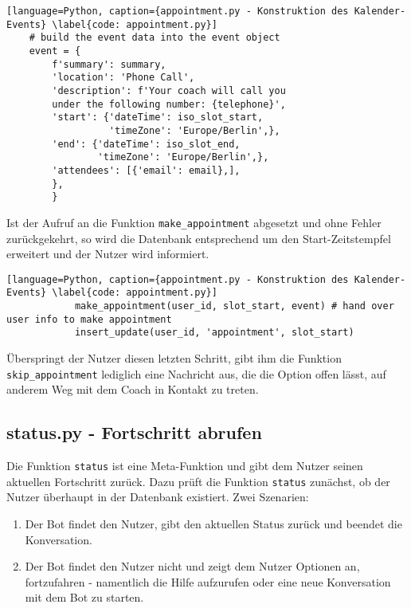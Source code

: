             \begin{lstlisting}[language=Python, caption={appointment.py - Konstruktion des Kalender-Events} \label{code: appointment.py}]
    # build the event data into the event object
    event = {
        f'summary': summary,
        'location': 'Phone Call',
        'description': f'Your coach will call you 
        under the following number: {telephone}',
        'start': {'dateTime': iso_slot_start,
                  'timeZone': 'Europe/Berlin',},
        'end': {'dateTime': iso_slot_end,
                'timeZone': 'Europe/Berlin',},
        'attendees': [{'email': email},],
        },
        }
            \end{lstlisting}
            
            Ist der Aufruf an die Funktion \verb|make_appointment| abgesetzt und ohne Fehler zurückgekehrt, so wird die Datenbank entsprechend um den Start-Zeitstempfel erweitert und der Nutzer wird informiert. 
            \begin{lstlisting}[language=Python, caption={appointment.py - Konstruktion des Kalender-Events} \label{code: appointment.py}]
            make_appointment(user_id, slot_start, event) # hand over user info to make appointment
            insert_update(user_id, 'appointment', slot_start)
            \end{lstlisting}

            Überspringt der Nutzer diesen letzten Schritt, gibt ihm die Funktion \verb|skip_appointment| lediglich eine Nachricht aus, die die Option offen lässt, auf anderem Weg mit dem Coach in Kontakt zu treten.

        \subsection{status.py - Fortschritt abrufen} \label{Implementierung: status.py}
            Die Funktion \verb|status| ist eine Meta-Funktion und gibt dem Nutzer seinen aktuellen Fortschritt zurück. Dazu prüft die Funktion \verb|status| zunächst, ob der Nutzer überhaupt in der Datenbank existiert. Zwei Szenarien: 
            \begin{enumerate}
                \item Der Bot findet den Nutzer, gibt den aktuellen Status zurück und beendet die Konversation.
                \item Der Bot findet den Nutzer nicht und zeigt dem Nutzer Optionen an, fortzufahren - namentlich die Hilfe aufzurufen oder eine neue Konversation mit dem Bot zu starten.
            \end{enumerate}







